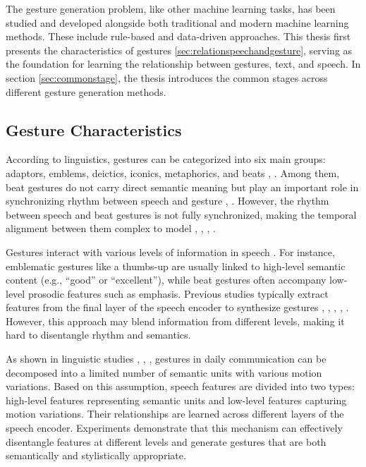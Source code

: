The gesture generation problem, like other machine learning tasks, has been studied and developed alongside both traditional and modern machine learning methods. These include rule-based and data-driven approaches. This thesis first presents the characteristics of gestures \autoref{sec:relationspeechandgesture}, serving as the foundation for learning the relationship between gestures, text, and speech. In section \autoref{sec:commonstage}, the thesis introduces the common stages across different gesture generation methods.


\subsection{Gesture Characteristics}
\label{sec:relationspeechandgesture}

According to linguistics, gestures can be categorized into six main groups: adaptors, emblems, deictics, iconics, metaphorics, and beats \cite{ekman1969repertoire}, \cite{sebeok2011advances}. Among them, beat gestures do not carry direct semantic meaning but play an important role in synchronizing rhythm between speech and gesture \cite{kipp2005gesture}, \cite{sebeok2011advances}. However, the rhythm between speech and beat gestures is not fully synchronized, making the temporal alignment between them complex to model \cite{mcclave1994gestural}, \cite{bhattacharya2021speech2affectivegestures}, \cite{kucherenko2020gesticulator}, \cite{yoon2020speech}.

Gestures interact with various levels of information in speech \cite{sebeok2011advances}. For instance, emblematic gestures like a thumbs-up are usually linked to high-level semantic content (e.g., “good” or “excellent”), while beat gestures often accompany low-level prosodic features such as emphasis. Previous studies typically extract features from the final layer of the speech encoder to synthesize gestures \cite{alexanderson2020style}, \cite{bhattacharya2021speech2affectivegestures}, \cite{kucherenko2021large}, \cite{qian2021speech}, \cite{yoon2022genea}. However, this approach may blend information from different levels, making it hard to disentangle rhythm and semantics.

As shown in linguistic studies \cite{kipp2005gesture}, \cite{neff2008gesture}, \cite{webb1997linguistic}, gestures in daily communication can be decomposed into a limited number of semantic units with various motion variations. Based on this assumption, speech features are divided into two types: high-level features representing semantic units and low-level features capturing motion variations. Their relationships are learned across different layers of the speech encoder. Experiments demonstrate that this mechanism can effectively disentangle features at different levels and generate gestures that are both semantically and stylistically appropriate.


